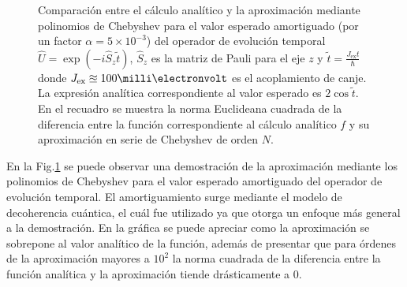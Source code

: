 \begin{figure}[htb]
	\centering
	
	\caption{Comparación entre el cálculo analítico y la aproximación mediante polinomios de Chebyshev para el valor esperado amortiguado (por un factor $\alpha = 5\times 10^{-3}$) del operador de evolución temporal $\hat{U} = \exp(-i \hat{S}_z \tilde{t})$, $\hat{S}_z$ es la matriz de Pauli para el eje $z$ y $\tilde{t} = \frac{J_{\mathrm{ex}}t}{\hbar}$ donde $J_{\mathrm{ex}}\approxeq 100\milli\electronvolt$ es el acoplamiento de canje. La expresión analítica correspondiente al valor esperado es $2\cos{\tilde{t}}$. En el recuadro se muestra la norma Euclideana cuadrada de la diferencia entre la función correspondiente al cálculo analítico $f$ y su aproximación en serie de Chebyshev de orden $N$.}
	\label{fig:comparison}
\end{figure}

En la Fig.\ref{fig:comparison} se puede observar una demostración de la aproximación mediante los polinomios de Chebyshev para el valor esperado amortiguado del operador de evolución temporal. El amortiguamiento surge mediante el modelo de decoherencia cuántica, el cuál fue utilizado ya que otorga un enfoque más general a la demostración. En la gráfica se puede apreciar como la aproximación se sobrepone al valor analítico de la función, además de presentar que para órdenes de la aproximación mayores a $10^2$ la norma cuadrada de la diferencia entre la función analítica y la aproximación tiende drásticamente a $0$. 